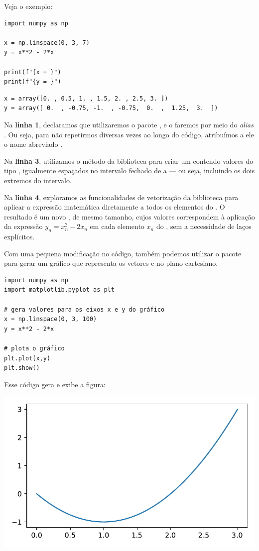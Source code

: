 Veja o exemplo:
\begin{verbatim}
import numpy as np

x = np.linspace(0, 3, 7)
y = x**2 - 2*x

print(f"{x = }")
print(f"{y = }")
\end{verbatim}
\begin{verbatim}
x = array([0. , 0.5, 1. , 1.5, 2. , 2.5, 3. ])
y = array([ 0.  , -0.75, -1.  , -0.75,  0.  ,  1.25,  3.  ])
\end{verbatim}

Na \textbf{linha 1}, declaramos que utilizaremos o pacote , e o faremos por meio do \emph{alias}
.
Ou seja, para não repetirmos  diversas vezes ao longo do código, atribuímos a ele o nome
abreviado .

Na \textbf{linha 3}, utilizamos o método  da biblioteca  para criar um 
contendo  valores do tipo , igualmente espaçados no intervalo fechado de  a
 --- ou seja, incluindo os dois extremos do intervalo.


Na \textbf{linha 4}, exploramos as funcionalidades de vetorização da biblioteca  para aplicar a
expressão matemática diretamente a todos os elementos do .
O resultado é um novo , de mesmo tamanho, cujos valores correspondem à aplicação da expressão
$y_n = x_n^2 - 2x_n$ em cada elemento $x_n$ do , sem a necessidade de laços explícitos.

Com uma pequena modificação no código, também podemos utilizar o pacote  para gerar um gráfico que
representa os vetores  e  no plano cartesiano.
\begin{verbatim}
import numpy as np
import matplotlib.pyplot as plt

# gera valores para os eixos x e y do gráfico
x = np.linspace(0, 3, 100)
y = x**2 - 2*x

# plota o gráfico
plt.plot(x,y)
plt.show()
\end{verbatim}

Esse código gera e exibe a figura:
\begin{center}
    \includegraphics[scale=1.0]{figs/parabola}
\end{center}

